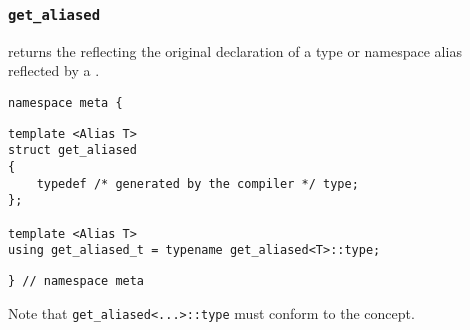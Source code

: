 

\subsubsection{\texttt{get\_aliased}}

returns the  reflecting the original declaration of a type or namespace alias reflected by a .

\begin{verbatim}
namespace meta {
\end{verbatim}
\begin{verbatim}
template <Alias T>
struct get_aliased
{
	typedef /* generated by the compiler */ type;
};
	
template <Alias T>
using get_aliased_t = typename get_aliased<T>::type;

\end{verbatim}
\begin{verbatim}
} // namespace meta
\end{verbatim}


Note that \texttt{get\_aliased<...>::type}
must conform to the  concept.
